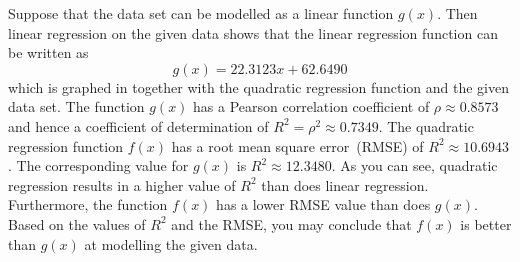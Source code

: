\documentclass[a4paper,oneside,12pt]{article}
\begin{document}
\begin{problem}
{\begin{solution}
Suppose that the data set can be modelled as a linear function
$g(x)$.  Then linear regression on the given data shows that the
linear regression function can be written as
\begin{equation}
\label{eqn:quadratic_applications:bluegill_linear_regression}
g(x)
=
22.3123x + 62.6490
\end{equation}
which is graphed in 
together with the quadratic regression function and the given data
set.  The function $g(x)$ has a Pearson correlation coefficient of
$\rho \approx 0.8573$ and hence a coefficient of determination of
$R^2 = \rho^2 \approx 0.7349$.  The quadratic regression function
$f(x)$ has a root mean square error~(RMSE) of
$R^2 \approx 10.6943$.  The corresponding value for $g(x)$ is
$R^2 \approx 12.3480$.  As you can see, quadratic regression results
in a higher value of $R^2$ than does linear regression.  Furthermore,
the function $f(x)$ has a lower RMSE value than does $g(x)$.  Based on
the values of $R^2$ and the RMSE, you may conclude that $f(x)$ is
better than $g(x)$ at modelling the given data.
\end{solution}
}{}
\end{problem}
\end{document}
